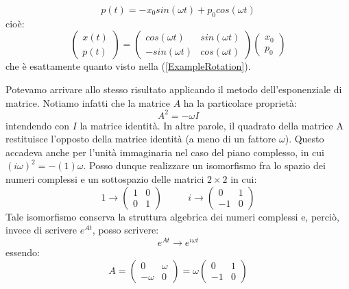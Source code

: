\documentclass[a4paper,openany]{article}
\begin{document}
	$$
	p(t) = -x_{0}sin(\omega t) + p_{0} cos(\omega t)
	$$
	cioè:
	\begin{equation}
		\begin{pmatrix}
			x(t) \\
			p(t)
		\end{pmatrix}
		=
		\begin{pmatrix}
			cos(\omega t) & sin(\omega t) \\
			-sin(\omega t) & cos(\omega t)
		\end{pmatrix}
		\begin{pmatrix}
			x_{0} \\ p_{0}
		\end{pmatrix}
	\end{equation}
	che è esattamente quanto visto nella (\ref{ExampleRotation}). 
	
	Potevamo arrivare allo stesso risultato applicando il metodo dell'esponenziale di matrice. Notiamo infatti che la matrice $A$ ha la particolare proprietà:
	\begin{equation}
		A^{2} = -\omega I
	\end{equation}
	intendendo con $I$ la matrice identità. In altre parole, il quadrato della matrice A restituisce l'opposto della matrice identità (a meno di un fattore $\omega$). Questo accadeva anche per l'unità immaginaria nel caso del piano complesso, in cui $(i\omega)^{2} = -(1)\omega$. Posso dunque realizzare un isomorfismo fra lo spazio dei numeri complessi e un sottospazio delle matrici $2\times2$ in cui:
	\begin{equation}
		1 \rightarrow 
		\begin{pmatrix}
			1 & 0 \\
			0 &1
		\end{pmatrix}
		\>\>\>\>\>\>\>\>\>\>\>\>
		i \rightarrow 
		\begin{pmatrix}
			0 & 1 \\
			-1 & 0
		\end{pmatrix}
		\label{Iso}
	\end{equation}
	Tale isomorfismo conserva la struttura algebrica dei numeri complessi e, perciò, invece di scrivere $e^{At}$, posso scrivere:
	$$
	e^{At} \rightarrow e^{i\omega t}
	$$
	essendo:
	$$
	A = 
	\begin{pmatrix}
		0 & \omega \\
		-\omega & 0
	\end{pmatrix}
	= \omega 
	\begin{pmatrix}
		0 & 1 \\
		-1 & 0
	\end{pmatrix}
	$$
\end{document}

